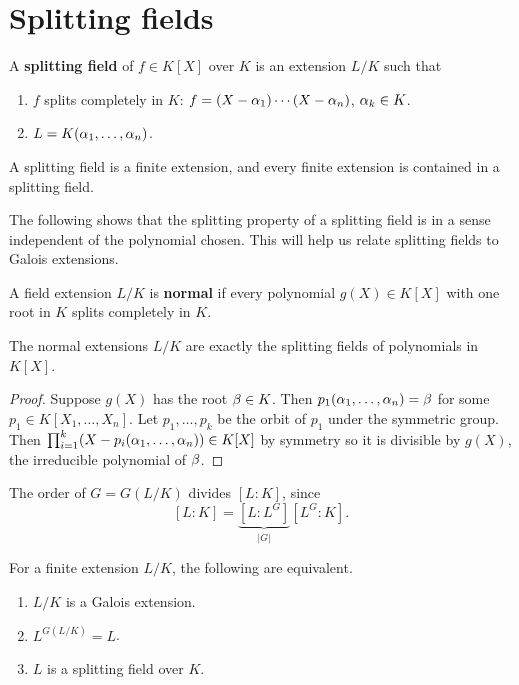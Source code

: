 \section{Splitting fields}
\begin{df}
A \textbf{splitting field} of $f\in K[X]$ over $K$ is an extension $L/K$ such that 
\begin{enumerate}
\item
$f$ splits completely in $K$: $f=(X-\alpha_1)\cdots (X-\alpha_n)$, $\alpha_k\in K$.
\item
$L=K(\alpha_1,\ldots, \alpha_n)$.
\end{enumerate}
\end{df}
A splitting field is a finite extension, and every finite extension is contained in a splitting field.

The following shows that the splitting property of a splitting field is in a sense independent of the polynomial chosen. This will help us relate splitting fields to Galois extensions.
\begin{df}
A field extension $L/K$ is \textbf{normal} if every polynomial $g(X)\in K[X]$ with one root in $K$ splits completely in $K$.
\end{df}
\begin{thm}[Splitting theorem]
The normal extensions $L/K$ are exactly the splitting fields of polynomials in $K[X]$.
\end{thm}
\begin{proof}
Suppose $g(X)$ has the root $\beta\in K$. Then $p_1(\alpha_1,\ldots, \alpha_n)=\beta$ for some $p_1\in K[X_1,\ldots, X_n]$. Let $p_1,\ldots, p_k$ be the orbit of $p_1$ under the symmetric group. Then $\prod_{i=1}^k (X-p_i(\alpha_1,\ldots, \alpha_n))\in K[X]$ by symmetry so it is divisible by $g(X)$, the irreducible polynomial of $\beta$.
\end{proof}
The order of $G=G(L/K)$ divides $[L:K]$, since 
\[
[L:K]=\underbrace{[L:L^G]}_{|G|}[L^G:K].
\]
\begin{thm}
For a finite extension $L/K$, the following are equivalent.
\begin{enumerate}
\item $L/K$ is a Galois extension.
\item $L^{G(L/K)}=L$.
\item $L$ is a splitting field over $K$.
\end{enumerate}
\end{thm}
